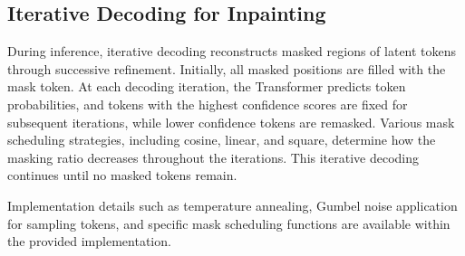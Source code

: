 \subsection{Iterative Decoding for Inpainting}

During inference, iterative decoding reconstructs masked regions of latent tokens through successive refinement.
Initially, all masked positions are filled with the mask token.
At each decoding iteration, the Transformer predicts token probabilities, and tokens with the highest confidence scores are fixed for subsequent iterations, while lower confidence tokens are remasked.
Various mask scheduling strategies, including cosine, linear, and square, determine how the masking ratio decreases throughout the iterations.
This iterative decoding continues until no masked tokens remain.

Implementation details such as temperature annealing, Gumbel noise application for sampling tokens, and specific mask scheduling functions are available within the provided implementation.

\inputminted[firstline=32, lastline=92, highlightlines={47,60,62-67}]{python}{../inpainting.py}

\inputminted[firstline=71, lastline=109]{python}{../models/VQGAN_Transformer.py}
